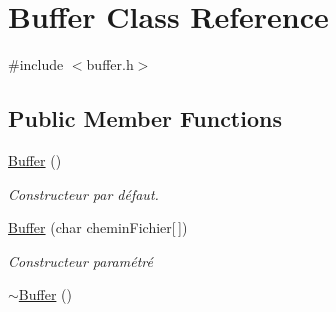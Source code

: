 \hypertarget{class_buffer}{\section{Buffer Class Reference}
\label{class_buffer}
}


{\ttfamily \#include $<$buffer.\-h$>$}

\subsection*{Public Member Functions}
\begin{DoxyCompactItemize}
\item 
\hypertarget{class_buffer_ae7ef2cd201190fde551dcb902627112b}{\hyperlink{class_buffer_ae7ef2cd201190fde551dcb902627112b}{Buffer} ()}\label{class_buffer_ae7ef2cd201190fde551dcb902627112b}

\begin{DoxyCompactList}\small\item\em Constructeur par défaut. \end{DoxyCompactList}\item 
\hyperlink{class_buffer_a968f9c9b50fe02f7d76de200f78507b0}{Buffer} (char chemin\-Fichier\mbox{[}$\,$\mbox{]})
\begin{DoxyCompactList}\small\item\em Constructeur paramétré \end{DoxyCompactList}\item 
\hypertarget{class_buffer_a59b8743e4a5f731bdd0c4185c9ef263b}{\hyperlink{class_buffer_a59b8743e4a5f731bdd0c4185c9ef263b}{$\sim$\-Buffer} ()}\label{class_buffer_a59b8743e4a5f731bdd0c4185c9ef263b}


\end{DoxyCompactItemize}
